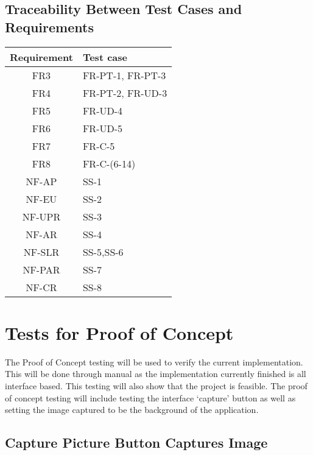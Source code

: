 \documentclass[12pt, titlepage]{article}
\begin{document}
\subsection{Traceability Between Test Cases and Requirements}
\begin{table}[H]
     
	\label{Table}
	\begin{tabular}{|c|L|}
		\hline
		\hline
		Requirement & Test case\\
		\hline
		FR3 & FR-PT-1, FR-PT-3\\
		\hline
		FR4 & FR-PT-2, FR-UD-3\\ 
		\hline 
		FR5 & FR-UD-4\\
		\hline
	    FR6 & FR-UD-5\\
	    \hline
	    FR7 & FR-C-5\\
		\hline
		FR8 & FR-C-(6-14)\\
		\hline
		NF-AP & SS-1\\
		\hline
		NF-EU & SS-2\\
		\hline
		NF-UPR & SS-3\\
		\hline
		NF-AR & SS-4\\
		\hline
		NF-SLR & SS-5,SS-6\\
		\hline 
		NF-PAR & SS-7\\
		\hline
		NF-CR & SS-8\\
		\hline
		\hline
		
	\end{tabular}
\end{table}

\section{Tests for Proof of Concept}
The Proof of Concept testing will be used to verify the current implementation. This will be done through manual as the implementation currently finished is all interface based. This testing will also show that the project is feasible. The proof of concept testing will include testing the interface ‘capture’ button as well as setting the image captured to be the background of the application.

\subsection{Capture Picture Button Captures Image}
		
\end{document}
